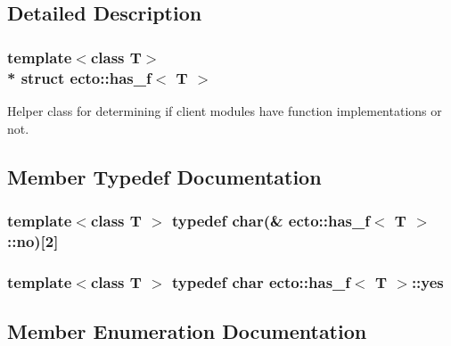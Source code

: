 \subsection{Detailed Description}
\subsubsection*{template$<$class T$>$\\*
struct ecto\+::has\+\_\+f$<$ T $>$}

Helper class for determining if client modules have function implementations or not. 

\subsection{Member Typedef Documentation}
\subsubsection[{\texorpdfstring{no}{no}}]{\setlength{\rightskip}{0pt plus 5cm}template$<$class T $>$ typedef char(\& {\bf ecto\+::has\+\_\+f}$<$ T $>$\+::no)\mbox{[}2\mbox{]}}\hypertarget{structecto_1_1has__f_ae0c6da775cf20caed616e24681af2807}{}\label{structecto_1_1has__f_ae0c6da775cf20caed616e24681af2807}
\subsubsection[{\texorpdfstring{yes}{yes}}]{\setlength{\rightskip}{0pt plus 5cm}template$<$class T $>$ typedef char {\bf ecto\+::has\+\_\+f}$<$ T $>$\+::{\bf yes}}\hypertarget{structecto_1_1has__f_a3fb902f1eed02919195aff1a6b28eb76}{}\label{structecto_1_1has__f_a3fb902f1eed02919195aff1a6b28eb76}


\subsection{Member Enumeration Documentation}
